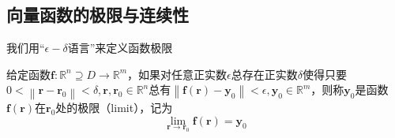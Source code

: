 \documentclass[main.tex]{subfiles}
\begin{document}
\subsection{向量函数的极限与连续性}
我们用“$\epsilon-\delta$语言”来定义函数极限

\begin{definition}[函数的极限]\label{def:II.11.1}
给定函数$\mathbf{f}:\mathbb{R}^n\supseteq D\rightarrow\mathbb{R}^m$，如果对任意正实数$\epsilon$总存在正实数$\delta$使得只要$0<\left\|\mathbf{r}-\mathbf{r}_0\right\|<\delta,\mathbf{r},\mathbf{r}_0\in\mathbb{R}^n$总有$\left\|\mathbf{f}\left(\mathbf{r}\right)-\mathbf{y}_0\right\|<\epsilon,\mathbf{y}_0\in\mathbb{R}^m$，则称$\mathbf{y}_0$是函数$\mathbf{f}\left(\mathbf{r}\right)$在$\mathbf{r}_0$处的极限（limit），记为
\[\lim_{\mathbf{r} \to\mathbf{r}_0} \mathbf{f}\left(\mathbf{r}\right)=\mathbf{y}_0\]
\end{definition}
\end{document}
